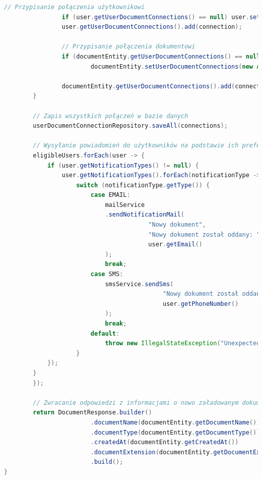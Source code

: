 \begin{lstlisting}[language=Java, style=JavaStyle, caption=Metoda dodawania dokumentu w klasie \texttt{DocumentServiceImp}]
				// Przypisanie połączenia użytkownikowi
				if (user.getUserDocumentConnections() == null) user.setUserDocumentConnections(new ArrayList<>());
				user.getUserDocumentConnections().add(connection);

				// Przypisanie połączenia dokumentowi
				if (documentEntity.getUserDocumentConnections() == null)
						documentEntity.setUserDocumentConnections(new ArrayList<>());

				documentEntity.getUserDocumentConnections().add(connection);
		}

		// Zapis wszystkich połączeń w bazie danych
		userDocumentConnectionRepository.saveAll(connections);

		// Wysyłanie powiadomień do użytkowników na podstawie ich preferencji
		eligibleUsers.forEach(user -> {
			if (user.getNotificationTypes() != null) {
				user.getNotificationTypes().forEach(notificationType -> {
					switch (notificationType.getType()) {
						case EMAIL:
							mailService
							.sendNotificationMail(
										"Nowy dokument",
										"Nowy dokument został oddany: " + documentEntity.getDocumentName(),
										user.getEmail()
							);
							break;
						case SMS:
							smsService.sendSms(
											"Nowy dokument został oddany: " + documentEntity.getDocumentName(),
											user.getPhoneNumber()
							);
							break;
						default:
							throw new IllegalStateException("Unexpected value: " + notificationType.getType());
					}
			});
		}
		});

		// Zwracanie odpowiedzi z informacjami o nowo załadowanym dokumencie
		return DocumentResponse.builder()
						.documentName(documentEntity.getDocumentName())
						.documentType(documentEntity.getDocumentType())
						.createdAt(documentEntity.getCreatedAt())
						.documentExtension(documentEntity.getDocumentExtension())
						.build();
}
\end{lstlisting}

